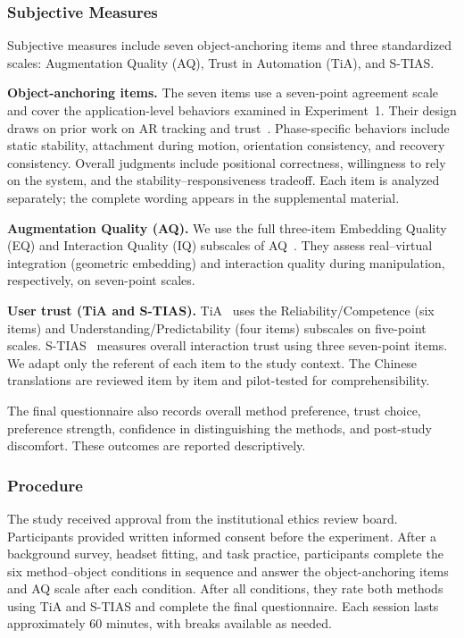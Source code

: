 \documentclass[review]{vgtc}
\begin{document}
\subsubsection{Subjective Measures}

Subjective measures include seven object-anchoring items and three standardized scales: Augmentation Quality (AQ), Trust in Automation (TiA), and S-TIAS.

\textbf{Object-anchoring items.}
The seven items use a seven-point agreement scale and cover the application-level behaviors examined in Experiment~1. Their design draws on prior work on AR tracking and trust~\cite{trustar2024}. Phase-specific behaviors include static stability, attachment during motion, orientation consistency, and recovery consistency. Overall judgments include positional correctness, willingness to rely on the system, and the stability--responsiveness tradeoff. Each item is analyzed separately; the complete wording appears in the supplemental material.

\textbf{Augmentation Quality (AQ).}
We use the full three-item Embedding Quality (EQ) and Interaction Quality (IQ) subscales of AQ~\cite{aq2026}. They assess real--virtual integration (geometric embedding) and interaction quality during manipulation, respectively, on seven-point scales.

\textbf{User trust (TiA and S-TIAS).}
TiA~\cite{tia2019} uses the Reliability/Competence (six items) and Understanding/Predictability (four items) subscales on five-point scales. S-TIAS~\cite{stias2025} measures overall interaction trust using three seven-point items. We adapt only the referent of each item to the study context. The Chinese translations are reviewed item by item and pilot-tested for comprehensibility.

The final questionnaire also records overall method preference, trust choice, preference strength, confidence in distinguishing the methods, and post-study discomfort. These outcomes are reported descriptively.

\subsubsection{Procedure}

The study received approval from the institutional ethics review board. Participants provided written informed consent before the experiment. After a background survey, headset fitting, and task practice, participants complete the six method--object conditions in sequence and answer the object-anchoring items and AQ scale after each condition. After all conditions, they rate both methods using TiA and S-TIAS and complete the final questionnaire. Each session lasts approximately 60 minutes, with breaks available as needed.
\end{document}
